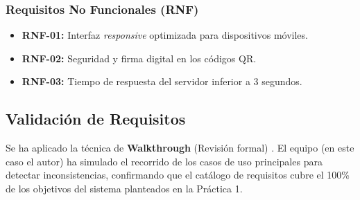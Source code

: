 \subsubsection{Requisitos No Funcionales (RNF)}
\begin{itemize}
    \item \textbf{RNF-01:} Interfaz \textit{responsive} optimizada para dispositivos móviles.
    \item \textbf{RNF-02:} Seguridad y firma digital en los códigos QR.
    \item \textbf{RNF-03:} Tiempo de respuesta del servidor inferior a 3 segundos.
\end{itemize}

\subsection{Validación de Requisitos}
Se ha aplicado la técnica de \textbf{Walkthrough} (Revisión formal) \cite{Sommerville2015}. El equipo (en este caso el autor) ha simulado el recorrido de los casos de uso principales para detectar inconsistencias, confirmando que el catálogo de requisitos cubre el 100\% de los objetivos del sistema planteados en la Práctica 1.
